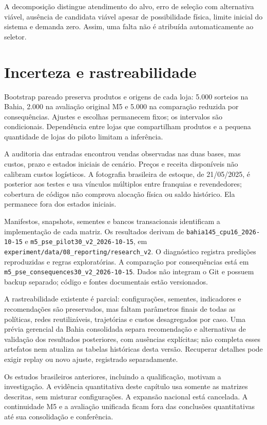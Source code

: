 A decomposição distingue atendimento do alvo, erro de seleção com alternativa viável, ausência de candidata viável apesar de possibilidade física, limite inicial do sistema e demanda zero. Assim, uma falta não é atribuída automaticamente ao seletor.

\section{Incerteza e rastreabilidade}
\label{sec:protocolo_exp}\label{sec:reporting}\label{app:reproducibility}
Bootstrap pareado preserva produtos e origens de cada loja: 5.000 sorteios na Bahia, 2.000 na avaliação original M5 e 5.000 na comparação reduzida por consequências. Ajustes e escolhas permanecem fixos; os intervalos são condicionais. Dependência entre lojas que compartilham produtos e a pequena quantidade de lojas do piloto limitam a inferência.

A auditoria das entradas encontrou vendas observadas nas duas bases, mas custos, prazo e estados iniciais de cenário. Preços e receita disponíveis não calibram custos logísticos. A fotografia brasileira de estoque, de 21/05/2025, é posterior aos testes e usa vínculos múltiplos entre franquias e revendedores; cobertura de códigos não comprova alocação física ou saldo histórico. Ela permanece fora dos estados iniciais.

Manifestos, snapshots, sementes e bancos transacionais identificam a implementação de cada matriz. Os resultados derivam de \nolinkurl{bahia145_cpu16_2026-10-15} e \nolinkurl{m5_pse_pilot30_v2_2026-10-15}, em \nolinkurl{experiment/data/08_reporting/research_v2}. O diagnóstico registra predições reproduzidas e regras exploratórias. A comparação por consequências está em \nolinkurl{m5_pse_consequences30_v2_2026-10-15}. Dados não integram o Git e possuem backup separado; código e fontes documentais estão versionados.

A rastreabilidade existente é parcial: configurações, sementes, indicadores e recomendações são preservados, mas faltam parâmetros finais de todas as políticas, redes reutilizáveis, trajetórias e custos desagregados por caso. Uma prévia gerencial da Bahia consolidada separa recomendação e alternativas de validação dos resultados posteriores, com ausências explícitas; não completa esses artefatos nem atualiza as tabelas históricas desta versão. Recuperar detalhes pode exigir replay ou novo ajuste, registrado separadamente.

Os estudos brasileiros anteriores, incluindo a qualificação, motivam a investigação. A evidência quantitativa deste capítulo usa somente as matrizes descritas, sem misturar configurações. A expansão nacional está cancelada. A continuidade M5 e a avaliação unificada ficam fora das conclusões quantitativas até sua consolidação e conferência.
